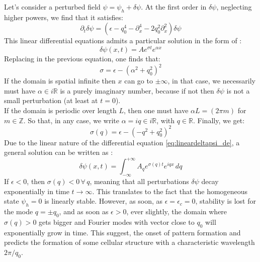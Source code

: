 \documentclass[11pt]{article}
\begin{document}
Let's consider a perturbed field $\psi = \psi_h+\delta \psi$. At the first order in $\delta \psi$, neglecting higher powers, we find that it satisfies:
\begin{equation}\label{eq:lineardeltapsi_de}
    \partial_t \delta \psi = \left(\epsilon - q_0^4-\partial_x^4-2q_0^2\partial_x^2\right ) \delta \psi
\end{equation}
This linear differential equations admits a particular solution in the form of :
\begin{equation}
    \delta \psi(x,t)= A e^{\sigma t}e^{\alpha x}
\end{equation}
Replacing in the previous equation, one finds that:
\begin{equation}
    \sigma = \epsilon -(\alpha^2+q_0^2)^2
\end{equation}
If the domain is spatial infinite then $x$ can go to $\pm \infty$, in that case, we necessarily must have $\alpha \in i \mathbb{R}$ is a purely imaginary number, because if not then $\delta\psi$ is not a small perturbation (at least at $t=0$).\\ If the domain is periodic over length $L$, then one must have $\alpha L= (2 \pi m) $ for $m \in \mathbb{Z}$. So that, in any case, we write $\alpha = i q \in i \mathbb{R}$, with $q \in \mathbb{R}$. Finally, we get:
\begin{equation}
    \sigma(q) = \epsilon -(-q^2+q_0^2)^2
\end{equation}
Due to the linear nature of the differential equation \cref{eq:lineardeltapsi_de}, a general solution can be written as :
\begin{equation}
    \delta\psi(x,t)= \int_{-\infty}^{+\infty} A_q e^{\sigma(q) t} e^{iqx} \, dq
\end{equation}
If $\epsilon<0$, then $\sigma(q) <0 \, \forall \,  q$, meaning that all perturbations $\delta \psi$ decay exponentially in time $t\rightarrow \infty$. This translates to the fact that the homogeneous state $\psi_h=0$ is linearly stable. However, as soon, as $\epsilon=\epsilon_c=0$, stability is lost for the mode $q=\pm q_0$, and as soon as $\epsilon>0$, ever slightly, the domain where $\sigma(q)>0$ gets bigger and Fourier modes with vector close to $q_0$ will exponentially grow in time. This suggest, the onset of pattern formation and predicts the formation of some cellular structure with a characteristic wavelength $2\pi/q_0$.
\end{document}
